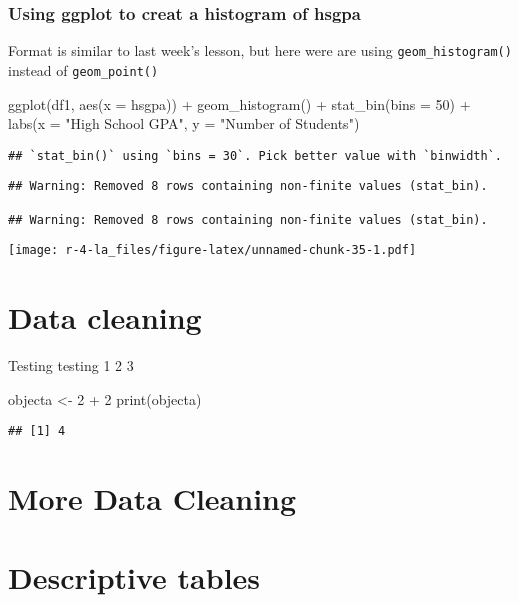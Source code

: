 \documentclass[
]{book}
\newenvironment{Shaded}{\begin{snugshade}}{\end{snugshade}}
\newcommand{\AttributeTok}[1]{\textcolor[rgb]{0.77,0.63,0.00}{#1}}
\newcommand{\DecValTok}[1]{\textcolor[rgb]{0.00,0.00,0.81}{#1}}
\newcommand{\FunctionTok}[1]{\textcolor[rgb]{0.00,0.00,0.00}{#1}}
\newcommand{\NormalTok}[1]{#1}
\newcommand{\OtherTok}[1]{\textcolor[rgb]{0.56,0.35,0.01}{#1}}
\newcommand{\SpecialCharTok}[1]{\textcolor[rgb]{0.00,0.00,0.00}{#1}}
\newcommand{\StringTok}[1]{\textcolor[rgb]{0.31,0.60,0.02}{#1}}
\begin{document}
\hypertarget{using-ggplot-to-creat-a-histogram-of-hsgpa}{%
\subsection{Using ggplot to creat a histogram of hsgpa}\label{using-ggplot-to-creat-a-histogram-of-hsgpa}}

Format is similar to last week's lesson, but here were are using \texttt{geom\_histogram()} instead of \texttt{geom\_point()}

\begin{Shaded}
\begin{Highlighting}[]
\FunctionTok{ggplot}\NormalTok{(df1, }\FunctionTok{aes}\NormalTok{(}\AttributeTok{x =}\NormalTok{ hsgpa)) }\SpecialCharTok{+}
  \FunctionTok{geom\_histogram}\NormalTok{() }\SpecialCharTok{+}
  \FunctionTok{stat\_bin}\NormalTok{(}\AttributeTok{bins =} \DecValTok{50}\NormalTok{) }\SpecialCharTok{+}
  \FunctionTok{labs}\NormalTok{(}\AttributeTok{x =} \StringTok{"High School GPA"}\NormalTok{, }\AttributeTok{y =} \StringTok{"Number of Students"}\NormalTok{)}
\end{Highlighting}
\end{Shaded}

\begin{verbatim}
## `stat_bin()` using `bins = 30`. Pick better value with `binwidth`.
\end{verbatim}

\begin{verbatim}
## Warning: Removed 8 rows containing non-finite values (stat_bin).

## Warning: Removed 8 rows containing non-finite values (stat_bin).
\end{verbatim}

\texttt{[image: r-4-la\_files/figure-latex/unnamed-chunk-35-1.pdf]}

\hypertarget{data-cleaning}{%
\chapter{Data cleaning}\label{data-cleaning}}

Testing testing 1 2 3

\begin{Shaded}
\begin{Highlighting}[]
\NormalTok{objecta }\OtherTok{\textless{}{-}} \DecValTok{2} \SpecialCharTok{+} \DecValTok{2}
\FunctionTok{print}\NormalTok{(objecta)}
\end{Highlighting}
\end{Shaded}

\begin{verbatim}
## [1] 4
\end{verbatim}

\hypertarget{more-data-cleaning}{%
\chapter{More Data Cleaning}\label{more-data-cleaning}}

\hypertarget{descriptive-tables}{%
\chapter{Descriptive tables}\label{descriptive-tables}}

  
\end{document}
